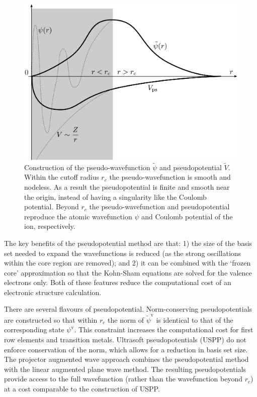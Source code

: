 \begin{figure}[h]
\centering
  \includegraphics[width=0.6\columnwidth]{figures/ch3/ppfigure.png}
  \caption[Construction of the pseudo-wavefunction and pseudopotential]{Construction of the pseudo-wavefunction $\tilde{\psi}$ and pseudopotential $\tilde{V}$. Within the cutoff radius $r_c$ the pseudo-wavefunction is smooth and nodeless. As a result the pseudopotential is finite and smooth near the origin, instead of having a singularity like the Coulomb potential. Beyond $r_c$ the pseudo-wavefunction and pseudopotential reproduce the atomic wavefunction $\psi$ and Coulomb potential of the ion, respectively.}
  \label{ppfigure}
\end{figure}

The key benefits of the pseudopotential method are that: 1) the size of the basis set needed to expand the wavefunctions is reduced (as the strong oscillations within the core region are removed); and 2) it can be combined with the `frozen core' approximation so that the Kohn-Sham equations are solved for the valence electrons only. Both of these features reduce the computational cost of an electronic structure calculation.

There are several flavours of pseudopotential. Norm-conserving pseudopotentials are constructed so that within $r_c$ the norm of $\tilde{\psi}^\mathrm{v}$ is identical to that of the corresponding state $\psi^\mathrm{v}$. This constraint increases the computational cost for first row elements and transition metals. Ultrasoft pseudopotentials (USPP) do not enforce conservation of the norm, which allows for a reduction in basis set size. The projector augmented wave approach combines the pseudopotential method with the linear augmented plane wave method.\autocite{Blochl1994} The resulting pseudopotentials provide access to the full wavefunction (rather than the wavefunction beyond $r_c$) at a cost comparable to the construction of USPP.


